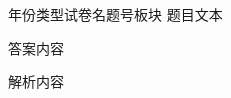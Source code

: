 ﻿%

\begin{problem}{年份}{类型}{试卷名}{题号}{板块}
题目文本

\begin{choices}
\end{choices}
\end{problem}

\begin{answer}
答案内容
\end{answer}

\begin{solutions}
解析内容
\end{solutions}
